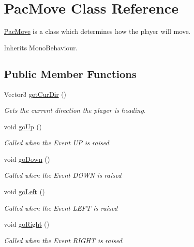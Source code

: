 \hypertarget{class_pac_move}{\section{Pac\-Move Class Reference}
\label{class_pac_move}
}


\hyperlink{class_pac_move}{Pac\-Move} is a class which determines how the player will move.  




Inherits Mono\-Behaviour.

\subsection*{Public Member Functions}
\begin{DoxyCompactItemize}
\item 
Vector3 \hyperlink{class_pac_move_ac5f9ee7e29ccec155c96f455084fd657}{get\-Cur\-Dir} ()
\begin{DoxyCompactList}\small\item\em Gets the current direction the player is heading. \end{DoxyCompactList}\item 
void \hyperlink{class_pac_move_acd95ac0f1076e9b20c3bc2f6cc046a7c}{go\-Up} ()
\begin{DoxyCompactList}\small\item\em Called when the Event U\-P is raised \end{DoxyCompactList}\item 
void \hyperlink{class_pac_move_ad70639e8a6bf24a83deb5f9500f248fd}{go\-Down} ()
\begin{DoxyCompactList}\small\item\em Called when the Event D\-O\-W\-N is raised \end{DoxyCompactList}\item 
void \hyperlink{class_pac_move_a41e79a9a69c2d98461523cbbc1b0a130}{go\-Left} ()
\begin{DoxyCompactList}\small\item\em Called when the Event L\-E\-F\-T is raised \end{DoxyCompactList}\item 
void \hyperlink{class_pac_move_aba622a9707ec3e12625e74a90ab33190}{go\-Right} ()
\begin{DoxyCompactList}\small\item\em Called when the Event R\-I\-G\-H\-T is raised \end{DoxyCompactList}\end{DoxyCompactItemize}


